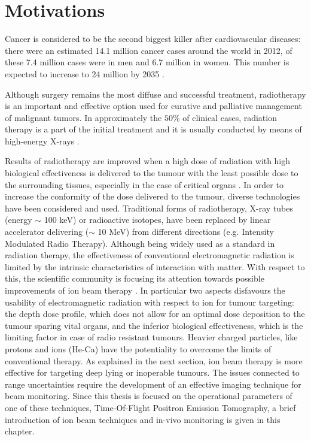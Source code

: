 \chapter{Motivations}

Cancer is considered to be the second biggest killer after cardiovascular diseases: there were an estimated 14.1 million cancer cases around the world in 2012, of these 7.4 million cases were in men and 6.7 million in women. This number is expected to increase to 24 million by 2035 \cite{Ferlay2012}.

Although surgery remains the most diffuse and successful treatment, radiotherapy is an important and effective option used for curative and palliative management of malignant tumors.
In approximately the $50\%$ of clinical cases, radiation therapy is a part of the initial treatment and it is usually conducted by means of high-energy X-rays \cite{Durante2010}.

Results of radiotherapy are improved when a high dose of radiation with high biological effectiveness is delivered to the tumour with the least possible dose to the surrounding tissues, especially in the case of critical organs \cite{Linz2011}.
In order to increase the conformity of the dose delivered to the tumour, diverse technologies have been considered and used.
Traditional forms of radiotherapy, X-ray tubes (energy $\sim$ 100 keV) or radioactive isotopes, have been replaced by linear accelerator delivering ($\sim$ 10 MeV) from different directions (e.g. Intensity Modulated Radio Therapy).
Although being widely used as a standard in radiation therapy, the effectiveness of conventional electromagnetic radiation is limited by the intrinsic characteristics of interaction with matter.
With respect to this, the scientific community is focusing its attention towards possible improvements of ion beam therapy \cite{Amaldi2011}.
In particular two aspects disfavours the usability of electromagnetic radiation with respect to ion for tumour targeting: the depth dose profile, which does not allow for an optimal dose deposition to the tumour sparing vital organs,
and the inferior biological effectiveness, which is the limiting factor in case of radio resistant tumours.
Heavier charged particles, like protons and ions (He-Ca) have the potentiality to overcome the limits of conventional therapy. 
As explained in the next section, ion beam therapy is more effective for targeting deep lying  or inoperable tumours.
The issues connected to range uncertainties require the development of an effective imaging technique for beam monitoring. 
Since this thesis is focused on the operational parameters of one of these techniques, Time-Of-Flight Positron Emission Tomography, a brief introduction of ion beam techniques and in-vivo monitoring is given in this chapter.

